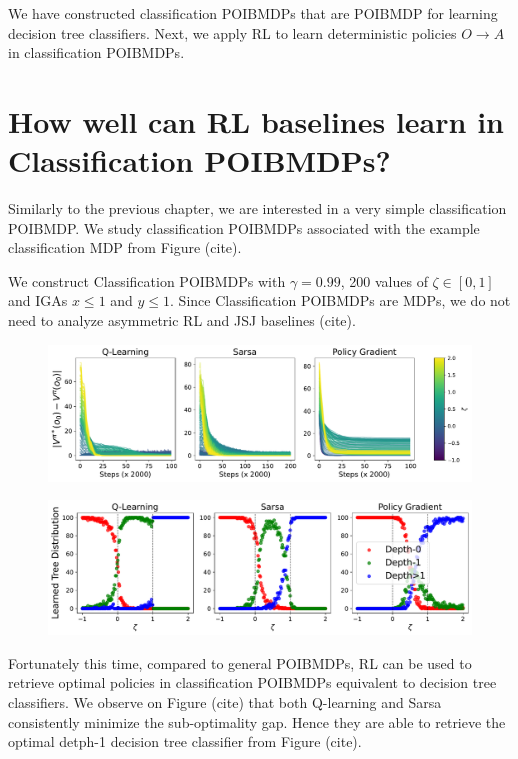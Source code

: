 We have constructed classification POIBMDPs that are POIBMDP for learning decision tree classifiers.
Next, we apply RL to learn deterministic policies $O\rightarrow A$ in classification POIBMDPs.

\section{How well can RL baselines learn in Classification POIBMDPs?}
Similarly to the previous chapter, we are interested in a very simple classification POIBMDP.
We study classification POIBMDPs associated with the example classification MDP from Figure (cite).

We construct Classification POIBMDPs with $\gamma=0.99$, 200 values of $\zeta \in [0,1]$ and IGAs $x\leq 1$ and $y\leq 1$.
Since Classification POIBMDPs are MDPs, we do not need to analyze asymmetric RL and JSJ baselines (cite).

\begin{figure}
    \centering
    \includegraphics[width=1\textwidth]{images/images_part1/learning_curves_classif.pdf}
    \caption{}\label{fig:rl-classif-poibmdp}
\end{figure}

\begin{figure}
    \centering
    \includegraphics[width=1\textwidth]{images/images_part1/tree_distributions_classif.pdf}
    \caption{}\label{fig:tree-distrib-classif-poibmdp}
\end{figure}

Fortunately this time, compared to general POIBMDPs, RL can be used to retrieve optimal policies in classification POIBMDPs equivalent to decision tree classifiers.
We observe on Figure (cite) that both Q-learning and Sarsa consistently minimize the sub-optimality gap. 
Hence they are able to retrieve the optimal detph-1 decision tree classifier from Figure (cite).

